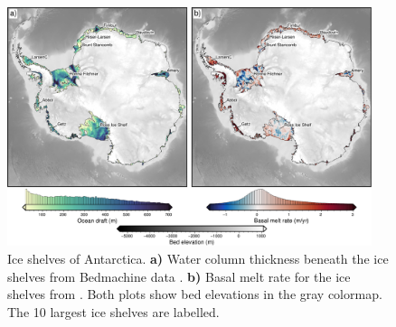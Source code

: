 \begin{figure}[!ht]
    \centering
    \includegraphics[width=0.95\textwidth]{figures/chp3/chp3_ice_shelves_basal_melt_and_ocean_draft.png}
    \caption[Ice shelves of Antarctica]{Ice shelves of Antarctica. \textbf{a)} Water column thickness beneath the ice shelves from Bedmachine data \citep{morlighemdeep2020, morlighemmeasures2022}. \textbf{b)} Basal melt rate for the ice shelves from \citet{adusumilliinterannual2020}. Both plots show bed elevations in the gray colormap. The 10 largest ice shelves are labelled.}
    \label{fig:chp3_ice_shelves}
\end{figure}

